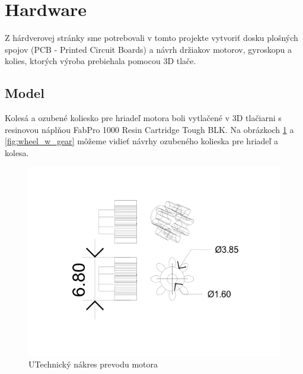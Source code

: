 
\section{Hardware}
Z hárdverovej stránky sme potrebovali v tomto projekte vytvoriť dosku plošných spojov (PCB - Printed Circuit Boards) a návrh držiakov motorov, gyroskopu a kolies, ktorých výroba prebiehala pomocou 3D tlače.
\subsection{Model}
\label{sec:hardware}
Kolesá a ozubené koliesko pre hriadeľ motora boli vytlačené v 3D tlačiarni s resinovou náplňou FabPro 1000 Resin Cartridge Tough BLK. Na obrázkoch \ref{fig:gear} a \ref{fig:wheel_w_gear} môžeme vidieť návrhy ozubeného kolieska pre hriadeľ a kolesa. 

\begin{figure}[!htbp]
        \centering
        \includegraphics[scale=0.8]{includes/images/motor_gear.png}
        \caption{UTechnický nákres prevodu motora}
        \label{fig:gear}
\end{figure}

